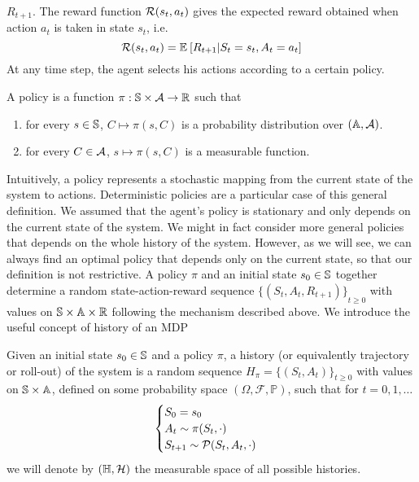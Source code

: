 $R_{t+1}$. The reward function $\calR(s_t, a_t)$ gives the expected reward
obtained when action $a_t$ is taken in state $s_t$, i.e. 
\begin{equation}
	\calR(s_t, a_t) = \E{R_{t+1} | S_t = s_t, A_t = a_t}
\end{equation}
At any time step, the agent selects his actions according to a certain policy. 
\begin{definition}[Policy]
	A policy is a function $\pi: \S \times \calA \to \R$ such that
	\begin{enumerate}[label={\roman*)}]
		\item for every $s \in \S$, $C \mapsto \pi(s,C)$ is a probability
			  distribution over $(\A, \calA)$. 
		\item for every $C \in \calA$, $s \mapsto \pi(s, C)$ is a measurable
			  function. 
	\end{enumerate}
\end{definition}
Intuitively, a policy represents a stochastic mapping from the current state of
the system to actions. Deterministic policies are a particular case of this 
general definition. We assumed that the agent's policy is stationary and only
depends on the current state of the system. We might in fact  consider more 
general policies that depends on the whole history of the system. However, as
we will see, we can always find an optimal policy that depends only on the
current state, so that our definition is not restrictive. A policy $\pi$ and an
initial state $s_0 \in \S$ together determine a random state-action-reward 
sequence ${\{(S_t, A_t, R_{t+1})\}}_{t\geq 0}$ with values on $\S \times \A
\times \R$ following the mechanism described above. We introduce the useful
concept of history of an MDP 
\begin{definition}[History]
	Given an initial state $s_0 \in \S$ and a policy $\pi$, a history (or
	equivalently trajectory or roll-out) of the system is a random sequence
	$H_\pi = {\{(S_t, A_t)\}}_{t\geq 0}$ with values on $\S \times \A$, defined
	on some probability space $(\Omega, \mathcal{F}, \mathbb{P})$, such that for 
	$t = 0, 1, \ldots$
	\begin{equation}
		\begin{cases}
			S_0 = s_0\\
			A_t \sim \pi(S_t, \cdot)\\
			S_{t+1} \sim \calP(S_t, A_t, \cdot)\\
		\end{cases}
	\end{equation}
	we will denote by $(\H, \calH)$ the measurable space of all possible
	histories. 
\end{definition}
